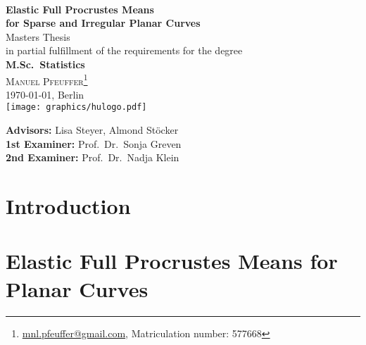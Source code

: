 \documentclass[a4paper,12pt,english,headings=small]{scrreprt}
\theoremstyle{plain}
\theoremstyle{definition}
\theoremstyle{remark}
\theoremstyle{plain}
\begin{document}

\begin{titlepage}
  \begin{center}
  \\
  \vspace{1.66cm}
    {\LARGE\sffamily\textbf{Elastic Full Procrustes Means\vspace{0.5cm}\\
    for Sparse and Irregular Planar Curves}}
  \vspace{1.2cm}\\
    {\large Masters Thesis}\\
    in partial fulfillment of the requirements for the degree\\
    \textbf{M.Sc.\ Statistics}
  \vspace{1.2cm}\\
  \textsc{\large Manuel Pfeuffer\footnote{\url{mnl.pfeuffer@gmail.com}, Matriculation number: 577668}}\\
  \today, Berlin
  \vspace{2.0cm}\\
    \texttt{[image: graphics/hulogo.pdf]}
  \vspace{0.5cm}\\

  \vfill
  \end{center}

  \noindent \textbf{Advisors:} Lisa Steyer, Almond Stöcker\\
  \noindent \textbf{1st Examiner:} Prof.\ Dr.\ Sonja Greven\\
  \noindent \textbf{2nd Examiner:} Prof.\ Dr.\ Nadja Klein
  \vspace{0.5em}

\end{titlepage}

\tableofcontents

\listoftodos


\newpage
{}
\chapter{Introduction}


\newpage
\chapter{Elastic Full Procrustes Means for Planar Curves}

\end{document}
